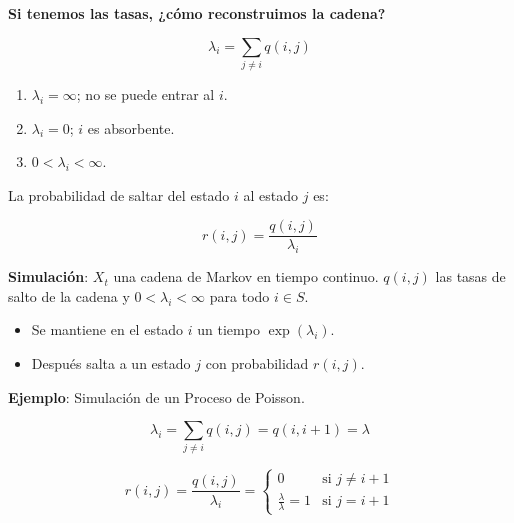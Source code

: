 \documentclass[12pt,a4paper]{article}
\begin{document}
\begin{center}
\end{center}


\textbf{Si tenemos las tasas, ¿cómo reconstruimos la cadena?}

\begin{equation*}
\lambda_i = \sum_{j \neq i} q(i,j)
\end{equation*}

\begin{enumerate}
    \item $\lambda_i = \infty$; no se puede entrar al $i$.
    \item $\lambda_i = 0$; $i$ es absorbente.
    \item $0 < \lambda_i < \infty$.
\end{enumerate}

La probabilidad de saltar del estado $i$ al estado $j$ es:

\begin{equation*}
r(i,j) = \frac{q(i,j)}{\lambda_i}
\end{equation*}


\textbf{Simulación}: $X_t$ una cadena de Markov en tiempo continuo. $q(i,j)$ las tasas de salto de la cadena y $0 < \lambda_i < \infty$ para todo $i \in S$.

\begin{itemize}
    \item Se mantiene en el estado $i$ un tiempo $\exp(\lambda_i)$.
    \item Después salta a un estado $j$ con probabilidad $r(i,j)$.
\end{itemize}

\textbf{Ejemplo}: Simulación de un Proceso de Poisson.

\begin{equation*}
\lambda_i = \sum_{j \neq i} q(i,j) = q(i,i+1) = \lambda
\end{equation*}

\begin{equation*}
r(i,j) = \frac{q(i,j)}{\lambda_i} = \begin{cases}
0 & \text{si } j \neq i+1 \\
\frac{\lambda}{\lambda} = 1 & \text{si } j = i+1
\end{cases}
\end{equation*}
\end{document}
